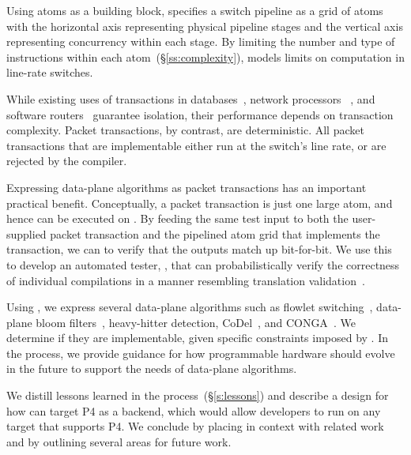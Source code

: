 Using atoms as a building block, \absmachine specifies a switch pipeline as a
grid of atoms with the horizontal axis representing physical pipeline stages
and the vertical axis representing concurrency within each stage.  By limiting
the number and type of instructions within each atom~(\S\ref{ss:complexity}),
\absmachine models limits on computation in line-rate switches.

While existing uses of transactions in databases~\cite{db_trans}, network
processors ~\cite{npus}, and software routers~\cite{click} guarantee isolation,
their performance depends on transaction complexity. Packet transactions, by
contrast, are deterministic. All packet transactions that are implementable
either run at the switch's line rate, or are rejected by the compiler.

Expressing data-plane algorithms as packet transactions has an important
practical benefit.  Conceptually, a packet transaction is just one large atom,
and hence can be executed on \absmachine.  By feeding the same test input to
both the user-supplied packet transaction and the pipelined atom grid that
implements the transaction, we can to verify that the outputs match up
bit-for-bit. We use this to develop an automated tester, \tester , that can
probabilistically verify the correctness of individual compilations in a manner
resembling translation validation~\cite{necula_validation}.

Using \pktlanguage, we express several data-plane algorithms such as flowlet
switching~\cite{flowlet}, data-plane bloom filters~\cite{bloom}, heavy-hitter
detection, CoDel~\cite{codel}, and CONGA~\cite{conga}. We determine if they are
implementable, given specific constraints imposed by \absmachine. In the
process, we provide guidance for how programmable hardware should evolve in the
future to support the needs of data-plane algorithms.

We distill lessons learned in the process~(\S\ref{s:lessons}) and describe a
design for how \pktlanguage can target P4 as a backend, which would allow
developers to run \pktlanguage on any target that supports P4. We conclude by
placing \pktlanguage in context with related work and by outlining several
areas for future work.

